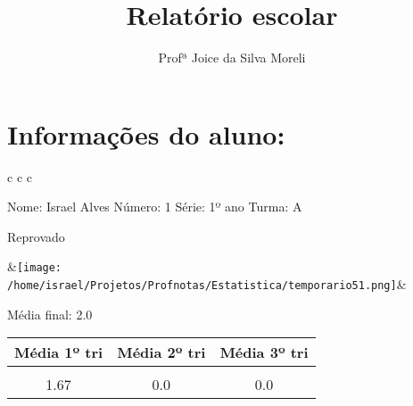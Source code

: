 \documentclass{article}%
\title{Relatório escolar}%
\author{Profª Joice da Silva Moreli}%
\begin{document}
%
\pagestyle{empty}%
\normalsize%
\maketitle%
\section*{Informações do aluno:}%
\label{sec:Informaesdoaluno}%
\begin{tabularx}{\textwidth}{c c c}%
\\%
\begin{minipage}[b]{0.25\textwidth}%
\flushleft%
Nome: Israel Alves%
\newline%
Número: 1%
\newline%
Série: 1º ano%
\newline%
Turma: A%
\newline%
\newline%
\begin{Large}%
Reprovado%
\end{Large}%
\newline%
\newline%
\newline%
\end{minipage}&\texttt{[image: /home/israel/Projetos/Profnotas/Estatistica/temporario51.png]}&\begin{minipage}[b]{0.23\textwidth}%
\flushleft%
\begin{Large}%
Média final: 2.0%
\end{Large}%
\newline%
\newline%
\newline%
\begin{tabular}[b]{c | c | c}%
\textbf{Média 1º tri}&\textbf{Média 2º tri}&\textbf{Média 3º tri}\\%
\hline%
&&\\%
1.67&0.0&0.0\\%
\end{tabular}%
\newline%
\newline%
\newline%
\end{minipage}\\%
\end{tabularx}%
\end{document}
